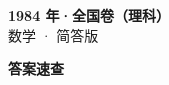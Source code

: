 \documentclass[zihao=-4, a4paper]{ctexart}
\begin{document}
\begin{center}
  {\Large\bfseries 1984 年·全国卷（理科）}\\[4pt]
  {\large 数学 · 简答版}
\end{center}
\medskip
{}

\clearpage
{}
\begin{center}{\Large\bfseries 答案速查}\end{center}
\medskip

\end{document}
